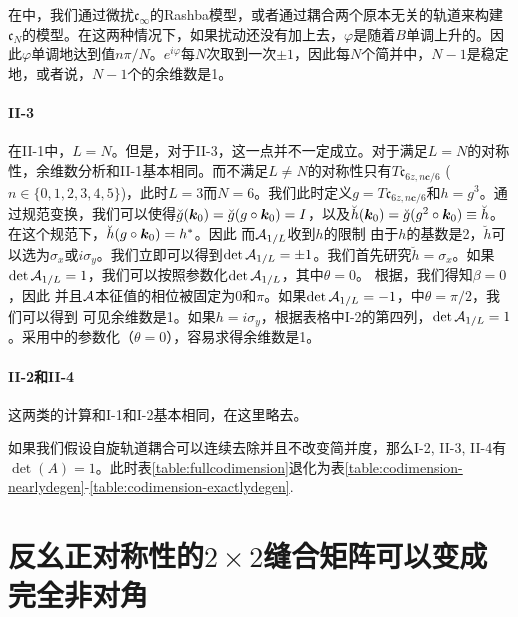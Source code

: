 在中，我们通过微扰$\mathfrak{c}_\infty$的Rashba模型，或者通过耦合两个原本无关的轨道来构建$\mathfrak{c}_N$的模型。在这两种情况下，如果扰动还没有加上去，$\varphi$是随着$B$单调上升的。因此$\varphi$单调地达到值$n\pi/N$。$e^{i\varphi}$每$N$次取到一次$\pm 1$，因此每$N$个简并中，$N-1$是稳定地，或者说，$N-1$个的余维数是1。

\paragraph*{II-3} 在II-1中，$L=N$。但是，对于II-3，这一点并不一定成立。对于满足$L=N$的对称性，余维数分析和II-1基本相同。而不满足$L\ne N$的对称性只有$T\mathfrak{c}_{6z,n\boldsymbol{c}/6}$ ($n\in\{0,1,2,3,4,5\}$)，此时$L=3$而$N=6$。我们此时定义$g=T\mathfrak{c}_{6z,n\boldsymbol{c}/6}$和$h=g^3$。通过规范变换，我们可以使得$\breve{g}(\boldsymbol{k}_0)=\breve{g}(g\circ\boldsymbol{k}_0)=I$，以及$\breve{h}(\boldsymbol{k}_0)=\breve{g}(g^2\circ \boldsymbol{k}_0)\equiv\breve{h}$。在这个规范下，$\breve{h}(g\circ\boldsymbol{k}_0)=h^*$。因此
而${\cal A}_{1/L}$收到$h$的限制 
由于$h$的基数是2，$\breve{h}$可以选为$\sigma_x$或$i\sigma_y$。我们立即可以得到$\det {\cal A}_{1/L} = \pm 1$。我们首先研究$\breve{h}=\sigma_x$。如果$\det {\cal A}_{1/L} = 1$，我们可以按照参数化$\det {\cal A}_{1/L}$，其中$\theta=0$。 根据，我们得知$\beta=0$，因此 
并且${\cal A}$本征值的相位被固定为$0$和$\pi$。如果$\det{{\cal A}_{1/L}}=-1$，中$\theta=\pi/2$，我们可以得到
可见余维数是1。如果$h=i\sigma_y$，根据表格中I-2的第四列，$\det {\cal A}_{1/L}=1$。采用中的参数化（$\theta=0$），容易求得余维数是1。

\paragraph*{II-2和II-4} 这两类的计算和I-1和I-2基本相同，在这里略去。

如果我们假设自旋轨道耦合可以连续去除并且不改变简并度，那么I-2, II-3, II-4有$\det(A)=1$。此时表\ref{table:fullcodimension}退化为表\ref{table:codimension-nearlydegen}-\ref{table:codimension-exactlydegen}.

\section{反幺正对称性的$2\times 2$缝合矩阵可以变成完全非对角\label{app:makinggoffdiagonal}}


